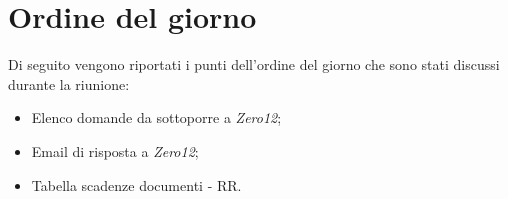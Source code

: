 \clearpage
\section{Ordine del giorno}
Di seguito vengono riportati i punti dell’ordine del giorno che sono stati discussi durante la riunione:
\begin{itemize}
	\item Elenco domande da sottoporre a \emph{Zero12};
	\item Email di risposta a \emph{Zero12};
	\item Tabella scadenze documenti - RR.
\end{itemize}
